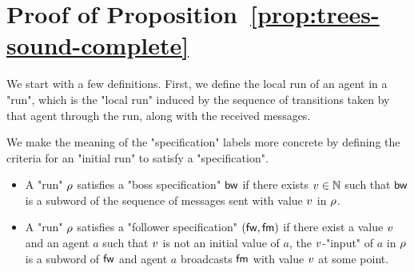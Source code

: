 \section{Proof of Proposition~\ref{prop:trees-sound-complete}}
\label{app:trees-sound-complete}

\treessoundcomplete*
 
We start with a few definitions. 
First, we define the local run of an agent in a "run", which is the "local run" induced by the sequence of transitions taken by that agent through the run, along with the received messages.


We make the meaning of the "specification" labels more concrete by defining the criteria for an "initial run" to satisfy a "specification".

\begin{itemize}
	\item A "run" $\rho$ satisfies a "boss specification" $\mathsf{bw}$ if there exists $v \in \mathbb{N}$ such that $\mathsf{bw}$ is a subword of the sequence of messages sent with value $v$ in $\rho$.
	
	\item A "run" $\rho$ satisfies a "follower specification" $(\mathsf{fw}, \mathsf{fm})$ if there exist a value $v$ and an agent $a$ such that $v$ is not an initial value of $a$, the $v$-"input" of $a$ in $\rho$ is a subword of $\mathsf{fw}$ and agent $a$ broadcasts $\mathsf{fm}$ with value $v$ at some point.
\end{itemize}

